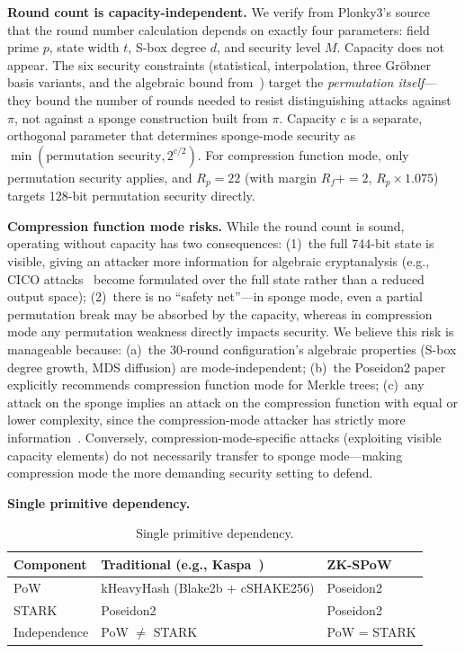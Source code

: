 \documentclass[11pt,a4paper]{article}
\begin{document}
\textbf{Round count is capacity-independent.} We verify from Plonky3's source~\cite{plonky3} that the round number calculation depends on exactly four parameters: field prime $p$, state width $t$, S-box degree $d$, and security level $M$. Capacity does not appear. The six security constraints (statistical, interpolation, three Gr\"obner basis variants, and the algebraic bound from~\cite{khovratovich2023}) target the \emph{permutation itself}---they bound the number of rounds needed to resist distinguishing attacks against $\pi$, not against a sponge construction built from $\pi$. Capacity $c$ is a separate, orthogonal parameter that determines sponge-mode security as $\min(\text{permutation security}, 2^{c/2})$. For compression function mode, only permutation security applies, and $R_p = 22$ (with margin $R_f \mathrel{{+}{=}} 2$, $R_p \times 1.075$) targets 128-bit permutation security directly.

\textbf{Compression function mode risks.} While the round count is sound, operating without capacity has two consequences: (1)~the full 744-bit state is visible, giving an attacker more information for algebraic cryptanalysis (e.g., CICO attacks~\cite{skipping2026} become formulated over the full state rather than a reduced output space); (2)~there is no ``safety net''---in sponge mode, even a partial permutation break may be absorbed by the capacity, whereas in compression mode any permutation weakness directly impacts security. We believe this risk is manageable because: (a)~the 30-round configuration's algebraic properties (S-box degree growth, MDS diffusion) are mode-independent; (b)~the Poseidon2 paper~\cite{poseidon2} explicitly recommends compression function mode for Merkle trees; (c)~any attack on the sponge implies an attack on the compression function with equal or lower complexity, since the compression-mode attacker has strictly more information~\cite{poseidon2}. Conversely, compression-mode-specific attacks (exploiting visible capacity elements) do not necessarily transfer to sponge mode---making compression mode the more demanding security setting to defend.

\textbf{Single primitive dependency.}

\begin{table}[h]
\centering
\begin{tabular}{@{}lll@{}}
\toprule
Component & Traditional (e.g., Kaspa~\cite{kaspa}) & ZK-SPoW \\
\midrule
PoW & kHeavyHash (Blake2b + cSHAKE256) & Poseidon2 \\
STARK & Poseidon2 & Poseidon2 \\
Independence & PoW $\neq$ STARK & PoW = STARK \\
\bottomrule
\end{tabular}
\caption{Single primitive dependency.}
\label{tab:dependency}
\end{table}
\end{document}
